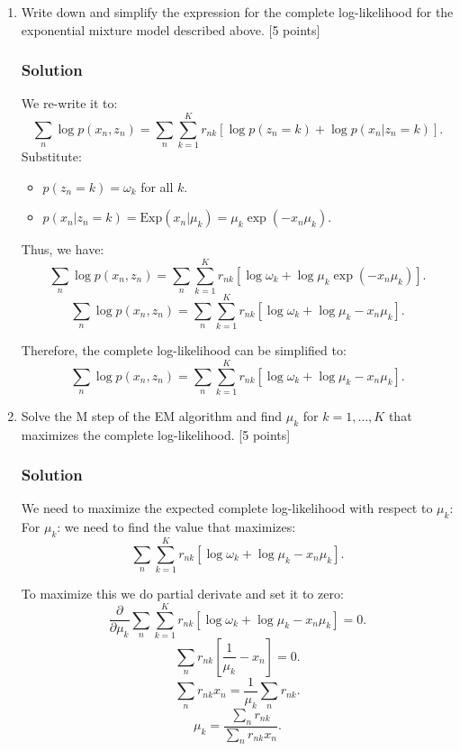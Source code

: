 \documentclass{article}
\begin{document}
\begin{enumerate}[label=(\alph*)]
    \item Write down and simplify the expression for the complete log-likelihood for the exponential mixture model described above. [5 points]
    \subsubsection*{Solution}
    We re-write it to:
    \[
    \sum_n \log p(x_n, z_n) = \sum_n \sum_{k=1}^K r_{nk} \left[\log p(z_n = k) + \log p(x_n|z_n = k)\right].
    \]
    Substitute:
    \begin{itemize}
        \item $p(z_n = k) = \omega_k$ for all $k$.
        \item $p(x_n|z_n = k) = \text{Exp}(x_n|\mu_k) = \mu_k \exp(-x_n\mu_k)$.
    \end{itemize}
    Thus, we have:
    \[
    \sum_n \log p(x_n, z_n) = \sum_n \sum_{k=1}^K r_{nk} \left[\log \omega_k + \log  \mu_k \exp(-x_n\mu_k)\right].
    \]
    \[
    \sum_n \log p(x_n, z_n) = \sum_n \sum_{k=1}^K r_{nk} \left[\log \omega_k + \log \mu_k - x_n\mu_k\right].
    \]

    Therefore, the complete log-likelihood can be simplified to:
    \[
    \sum_n \log p(x_n, z_n) = \sum_n \sum_{k=1}^K r_{nk} \left[\log \omega_k + \log \mu_k - x_n\mu_k\right].    
    \]

    \item Solve the M step of the EM algorithm and find $\mu_k$ for $k = 1, \ldots, K$ that maximizes the complete log-likelihood. [5 points]
    \subsubsection*{Solution}
    We need to maximize the expected complete log-likelihood with respect to $\mu_k$:\\
    For $\mu_k$: we need to find the value that maximizes:
    \[
    \sum_n \sum_{k=1}^K r_{nk} \left[\log \omega_k + \log \mu_k - x_n\mu_k\right].  
    \]

    To maximize this we do partial derivate and set it to zero:
    \[
    \frac{\partial}{\partial \mu_k} \sum_n \sum_{k=1}^K r_{nk} \left[\log \omega_k + \log \mu_k - x_n\mu_k\right] = 0.
    \]
    \[
    \sum_n r_{nk} \left[\frac{1}{\mu_k} - x_n\right] = 0.
    \]
    \[
    \sum_n r_{nk} x_n = \frac{1}{\mu_k} \sum_n r_{nk}.
    \]
    \[
    \mu_k = \frac{\sum_n r_{nk}}{\sum_n r_{nk} x_n}.
    \]





\end{enumerate}
\end{document}
